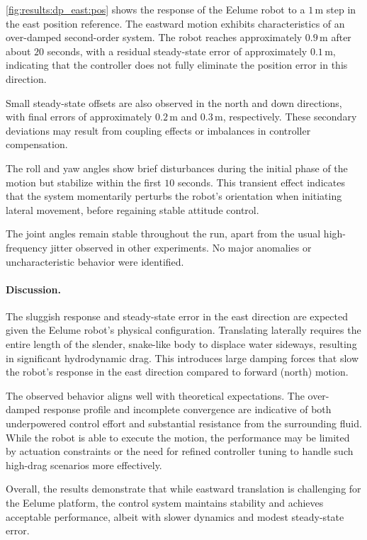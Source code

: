 \autoref{fig:results:dp_east:pos} shows the response of the Eelume robot to a 
\(1\,\mathrm{m}\) step in the east position reference. The eastward motion 
exhibits characteristics of an over-damped second-order system. The robot 
reaches approximately \(0.9\,\mathrm{m}\) after about \(20\) seconds, with a 
residual steady-state error of approximately \(0.1\,\mathrm{m}\), indicating 
that the controller does not fully eliminate the position error in this 
direction.

Small steady-state offsets are also observed in the north and down directions, 
with final errors of approximately \(0.2\,\mathrm{m}\) and \(0.3\,\mathrm{m}\),
respectively. These secondary deviations may result from coupling effects 
or imbalances in controller compensation.

The roll and yaw angles show brief disturbances during the initial phase of 
the motion but stabilize within the first \(10\) seconds. This transient 
effect indicates that the system momentarily perturbs the robot’s orientation 
when initiating lateral movement, before regaining stable attitude control.

The joint angles remain stable throughout the run, apart from the usual high-
frequency jitter observed in other experiments. No major anomalies or 
uncharacteristic behavior were identified.

\paragraph{Discussion.}

The sluggish response and steady-state error in the east direction are 
expected given the Eelume robot's physical configuration. Translating 
laterally requires the entire length of the slender, snake-like body to 
displace water sideways, resulting in significant hydrodynamic drag. This 
introduces large damping forces that slow the robot's response in the east 
direction compared to forward (north) motion.

The observed behavior aligns well with theoretical expectations. The over-
damped response profile and incomplete convergence are indicative of both 
underpowered control effort and substantial resistance from the surrounding 
fluid. While the robot is able to execute the motion, the performance may be 
limited by actuation constraints or the need for refined controller tuning to 
handle such high-drag scenarios more effectively.

Overall, the results demonstrate that while eastward translation is 
challenging for the Eelume platform, the control system maintains stability 
and achieves acceptable performance, albeit with slower dynamics and modest 
steady-state error.

